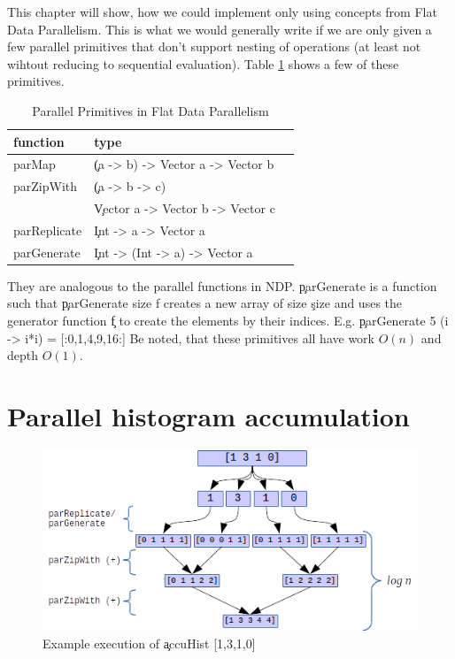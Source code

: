 

This chapter will show, how we could implement \algo
only using concepts from Flat Data Parallelism. This
is what we would generally write if we are only
given a few parallel primitives that don't support nesting
of operations (at least not wihtout reducing to sequential evaluation).
Table \ref{table:parprims} shows a few of these primitives.

  \begin{table}[h!]
    \caption{Parallel Primitives in Flat Data Parallelism}
    \label{table:parprims}
    \begin{center}
    \begin{tabular}{lll}
      \toprule
      function & type \\
      \midrule
      parMap & \c{(a -> b) -> Vector a -> Vector b} \\
      parZipWith & \c{(a -> b -> c)} \\
       & \c{Vector a -> Vector b -> Vector c} \\
      parReplicate & \c{Int -> a -> Vector a} \\
      parGenerate & \c{Int -> (Int -> a) -> Vector a} \\
    \end{tabular}
    \end{center}
  \end{table}
  They are analogous to the parallel functions in NDP.
  \c{parGenerate} is a function such that \c{parGenerate size f} creates a new array
  of size \c{size} and uses the generator function \c{f} to create
  the elements by their indices.
  E.g. \c{parGenerate 5 (\lam i -> i*i) = [:0,1,4,9,16:] }
  Be noted, that these primitives all have work $O(n)$ and depth $O(1)$.
  
\section{Parallel histogram accumulation}

  \begin{figure}[h!]
    \centering
    \includegraphics[width=\linewidth]{accuHist}
    \caption{Example execution of \c{accuHist [1,3,1,0]}}
    \label{fig:hist-org}
  \end{figure}

